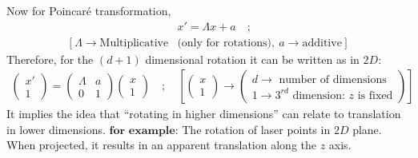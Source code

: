 \documentclass[14pt]{article} %
\begin{document}
\noindent Now for Poincaré transformation,
\begin{align*} 
&x' = \Lambda x + a \quad;\\
[~\Lambda \rightarrow \text{Multiplicative} &\text{(only for rotations)},~a \rightarrow \text{additive}~]
\end{align*}
Therefore, for the $(d + 1)$ dimensional rotation it can be written as in $2D$:
\begin{align*}
\begin{pmatrix}
x' \\
1
\end{pmatrix}
=
\begin{pmatrix}
\Lambda & a \\
0 & 1
\end{pmatrix}
\begin{pmatrix}
x \\
1
\end{pmatrix}
\quad;\quad\left[
\begin{pmatrix}
x \\
1
\end{pmatrix}
\to
\begin{pmatrix}
d \rightarrow \text{ number of dimensions} \\
1 \rightarrow 3^{rd} \text{ dimension: } z \text{ is fixed} 
\end{pmatrix}
\right]
\end{align*}
It implies the idea that ``rotating in higher dimensions'' can relate to translation in lower dimensions. $\textbf{for example:}$  The rotation of laser points in $2D$ plane. When projected, it results in an apparent translation along the $z$ axis. \\
\end{document}
